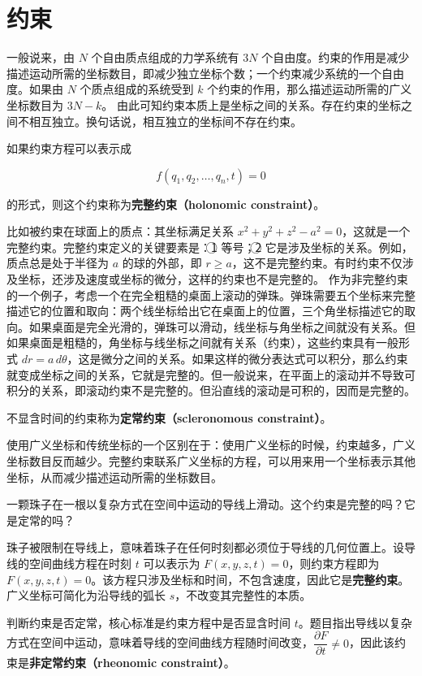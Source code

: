 \section{约束}
一般说来，由 $N$ 个自由质点组成的力学系统有 $3N$ 个自由度。约束的作用是减少描述运动所需的坐标数目，即减少独立坐标个数；一个约束减少系统的一个自由度。如果由 $N$ 个质点组成的系统受到 $k$ 个约束的作用，那么描述运动所需的广义坐标数目为 $3N - k$。
由此可知约束本质上是坐标之间的关系。存在约束的坐标之间不相互独立。换句话说，相互独立的坐标间不存在约束。
\begin{definition}[完整约束]
如果约束方程可以表示成

\[
f(q_1, q_2, \ldots, q_n, t) = 0
\]

的形式，则这个约束称为\textbf{完整约束（holonomic constraint）}。
\end{definition}
比如被约束在球面上的质点：其坐标满足关系 $x^2 + y^2 + z^2 - a^2 = 0$，这就是一个完整约束。完整约束定义的关键要素是：\textcircled{1} 等号；\textcircled{2} 它是涉及坐标的关系。例如，质点总是处于半径为 $a$ 的球的外部，即 $r \geq a$，这不是完整约束。有时约束不仅涉及坐标，还涉及速度或坐标的微分，这样的约束也不是完整的。
作为非完整约束的一个例子，考虑一个在完全粗糙的桌面上滚动的弹珠。弹珠需要五个坐标来完整描述它的位置和取向：两个线坐标给出它在桌面上的位置，三个角坐标描述它的取向。如果桌面是完全光滑的，弹珠可以滑动，线坐标与角坐标之间就没有关系。但如果桌面是粗糙的，角坐标与线坐标之间就有关系（约束），这些约束具有一般形式 $dr = a\,d\theta$，这是微分之间的关系。如果这样的微分表达式可以积分，那么约束就变成坐标之间的关系，它就是完整的。但一般说来，在平面上的滚动并不导致可积分的关系，即滚动约束不是完整的。但沿直线的滚动是可积的，因而是完整的。
\begin{definition}[定常约束]
不显含时间的约束称为\textbf{定常约束（scleronomous constraint）}。
\end{definition}
使用广义坐标和传统坐标的一个区别在于：使用广义坐标的时候，约束越多，广义坐标数目反而越少。完整约束联系广义坐标的方程，可以用来用一个坐标表示其他坐标，从而减少描述运动所需的坐标数目。
\begin{example}[例题 4.1（珠子在运动导线上滑动）]
一颗珠子在一根以复杂方式在空间中运动的导线上滑动。这个约束是完整的吗？它是定常的吗？
\end{example}
\begin{solution}
珠子被限制在导线上，意味着珠子在任何时刻都必须位于导线的几何位置上。设导线的空间曲线方程在时刻 $t$ 可以表示为 $F(x, y, z, t) = 0$，则约束方程即为 $F(x, y, z, t) = 0$。该方程只涉及坐标和时间，不包含速度，因此它是\textbf{完整约束}。广义坐标可简化为沿导线的弧长 $s$，不改变其完整性的本质。

判断约束是否定常，核心标准是约束方程中是否显含时间 $t$。题目指出导线以复杂方式在空间中运动，意味着导线的空间曲线方程随时间改变，$\dfrac{\partial F}{\partial t}\neq 0$，因此该约束是\textbf{非定常约束（rheonomic constraint）}。
\end{solution}
